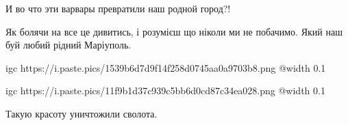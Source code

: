  
 
 
 
 

\qqSecCmt


И во что эти варвары превратили наш родной город?!


Як болячи на все це дивитись, і розумієш що ніколи ми не побачимо. Який наш буй
любий рідний Маріуполь.

\ifcmt
  igc https://i.paste.pics/1539b6d7d9f14f258d0745aa0a9703b8.png
	@width 0.1
\fi


\ifcmt
  igc https://i.paste.pics/11f9b1d37c939c5bb6d0cd87c34ea028.png
	@width 0.1
\fi


Такую красоту уничтожили сволота.
